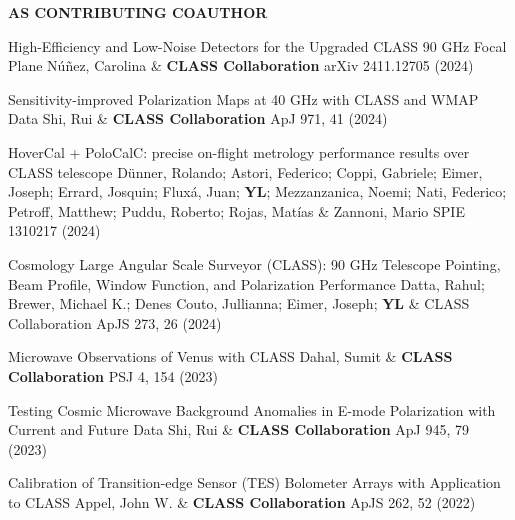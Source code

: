 \begin{footnotesize}
    \textsf{\textbf{ AS CONTRIBUTING COAUTHOR }}
\end{footnotesize}
\begin{etaremune}[topsep=0pt,itemsep=0pt,partopsep=0pt,parsep=0pt]
    \renewcommand\labelenumi{\footnotesize\bfseries\theenumi.}
    
            {High-Efficiency and Low-Noise Detectors for the Upgraded CLASS 90 GHz Focal Plane}
            {Núñez, Carolina \& \textbf{CLASS Collaboration}}
            {arXiv 2411.12705 (2024)}
    
            {Sensitivity-improved Polarization Maps at 40 GHz with CLASS and WMAP Data}
            {Shi, Rui \& \textbf{CLASS Collaboration}}
            {ApJ 971, 41 (2024)}
    
            {HoverCal + PoloCalC: precise on-flight metrology performance results over CLASS telescope}
            {Dünner, Rolando; Astori, Federico; Coppi, Gabriele; Eimer, Joseph; Errard, Josquin; Fluxá, Juan; \textbf{YL}; Mezzanzanica, Noemi; Nati, Federico; Petroff, Matthew; Puddu, Roberto; Rojas, Matías \& Zannoni, Mario}
            {SPIE 1310217 (2024)}
    
            {Cosmology Large Angular Scale Surveyor (CLASS): 90 GHz Telescope Pointing, Beam Profile, Window Function, and Polarization Performance}
            {Datta, Rahul; Brewer, Michael K.; Denes Couto, Jullianna; Eimer, Joseph; \textbf{YL} \& CLASS Collaboration}
            {ApJS 273, 26 (2024)}
    
            {Microwave Observations of Venus with CLASS}
            {Dahal, Sumit \& \textbf{CLASS Collaboration}}
            {PSJ 4, 154 (2023)}
    
            {Testing Cosmic Microwave Background Anomalies in E-mode Polarization with Current and Future Data}
            {Shi, Rui \& \textbf{CLASS Collaboration}}
            {ApJ 945, 79 (2023)}
    
            {Calibration of Transition-edge Sensor (TES) Bolometer Arrays with Application to CLASS}
            {Appel, John W. \& \textbf{CLASS Collaboration}}
            {ApJS 262, 52 (2022)}
    

\end{etaremune}
